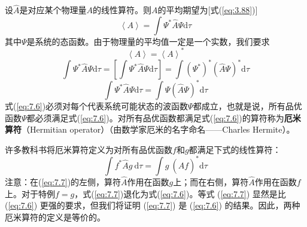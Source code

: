     设$\hat{A}$是对应某个物理量$A$的线性算符。则$A$的平均期望为[式(\ref{eq:3.88})]
    \begin{equation*}
        \left\langle A \right\rangle = \int \Psi^{\ast} \hat{A} \Psi \mathrm{d}\tau
    \end{equation*}
    其中$\Psi$是系统的态函数。由于物理量的平均值一定是一个实数，我们要求
    \begin{equation*}
        \left\langle A \right\rangle = \left\langle A \right\rangle^{\ast}
    \end{equation*}
    \begin{equation*}
        \int \Psi^{\ast} \hat{A} \Psi \mathrm{d}\tau = \left[\int \Psi^{\ast}\hat{A}\Psi\mathrm{d}\tau\right] = \int \left(\Psi^{\ast}\right)^{\ast} \left(\hat{A}\Psi\right)^{\ast}\mathrm{d}\tau
    \end{equation*}
    \begin{equation}
        \int \Psi^{\ast} \hat{A} \Psi \mathrm{d}\tau = \int \Psi  \left(\hat{A}\Psi\right)^{\ast} \mathrm{d}\tau
        \label{eq:7.6}
    \end{equation}
    式(\ref{eq:7.6})必须对每个代表系统可能状态的波函数$\Psi$都成立，也就是说，所有品优函数$\Psi$都必须满足式(\ref{eq:7.6})。对所有品优函数都满足式(\ref{eq:7.6})的算符称为\textbf{厄米算符}（Hermitian operator）（由数学家厄米的名字命名——Charles Hermite）。

    许多教科书将厄米算符定义为对所有品优函数$f$和$g$都满足下式的线性算符：
    \begin{equation}
        \int f^{\ast} \hat{A} g \:\mathrm{d}\tau = \int g \:\left(\hat{A} f\right)^{\ast} \mathrm{d}\tau
        \label{eq:7.7}
    \end{equation}
    注意：在(\ref{eq:7.7})的左侧，算符$\hat{A}$作用在函数$g$上；而在右侧，算符$\hat{A}$作用在函数$f$上。对于特例$f=g$，式(\ref{eq:7.7})退化为式(\ref{eq:7.6})。等式 (\ref{eq:7.7}) 显然是比 (\ref{eq:7.6}) 更强的要求，但我们将证明 (\ref{eq:7.7}) 是 (\ref{eq:7.6}) 的结果。因此，两种厄米算符的定义是等价的。

